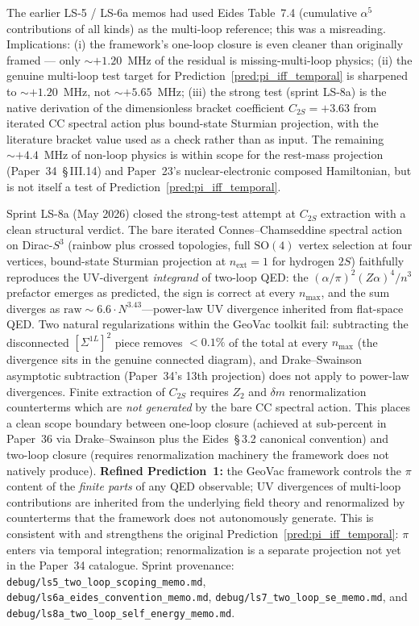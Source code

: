 \documentclass[11pt]{article}
\begin{document}
\begin{enumerate}
The earlier LS-5 / LS-6a memos had used Eides Table~7.4 (cumulative
$\alpha^5$ contributions of all kinds) as the multi-loop reference;
this was a misreading.  Implications: (i) the framework's one-loop
closure is even cleaner than originally framed --- only
$\sim +1.20$~MHz of the residual is missing-multi-loop physics;
(ii) the genuine multi-loop test target for
Prediction~\ref{pred:pi_iff_temporal} is sharpened to
$\sim +1.20$~MHz, not $\sim +5.65$~MHz; (iii) the strong test
(sprint LS-8a) is the native derivation of the dimensionless bracket
coefficient $C_{2S} = +3.63$ from iterated CC spectral action plus
bound-state Sturmian projection, with the literature bracket value
used as a check rather than as input.  The remaining $\sim +4.4$~MHz
of non-loop physics is within scope for the rest-mass projection
(Paper~34~\S\,III.14) and Paper~23's nuclear-electronic composed
Hamiltonian, but is not itself a test of
Prediction~\ref{pred:pi_iff_temporal}.

Sprint LS-8a (May 2026) closed the strong-test attempt at $C_{2S}$
extraction with a clean structural verdict.  The bare iterated
Connes--Chamseddine spectral action on Dirac-$S^3$ (rainbow plus
crossed topologies, full $\mathrm{SO}(4)$ vertex selection at four
vertices, bound-state Sturmian projection at $n_\text{ext} = 1$ for
hydrogen $2S$) faithfully reproduces the UV-divergent
\emph{integrand} of two-loop QED: the $(\alpha/\pi)^2 (Z\alpha)^4 /
n^3$ prefactor emerges as predicted, the sign is correct at every
$n_\text{max}$, and the sum diverges as
$\text{raw} \sim 6.6 \cdot N^{3.43}$---power-law UV divergence
inherited from flat-space QED.  Two natural regularizations
within the GeoVac toolkit fail: subtracting the disconnected
$[\Sigma^{1L}]^2$ piece removes ${<}0.1\%$ of the total at every
$n_\text{max}$ (the divergence sits in the genuine connected
diagram), and Drake--Swainson asymptotic subtraction
(Paper~34's 13th projection) does not apply to power-law
divergences.  Finite extraction of $C_{2S}$ requires $Z_2$ and
$\delta m$ renormalization counterterms which are
\emph{not generated} by the bare CC spectral action.  This places
a clean scope boundary between one-loop closure (achieved at
sub-percent in Paper~36 via Drake--Swainson plus the Eides~\S\,3.2
canonical convention) and two-loop closure (requires renormalization
machinery the framework does not natively produce).
\textbf{Refined Prediction~1:} the GeoVac framework controls the
$\pi$ content of the \emph{finite parts} of any QED observable; UV
divergences of multi-loop contributions are inherited from the
underlying field theory and renormalized by counterterms that the
framework does not autonomously generate.  This is consistent with
and strengthens the original Prediction~\ref{pred:pi_iff_temporal}:
$\pi$ enters via temporal integration; renormalization is a separate
projection not yet in the Paper~34 catalogue.  Sprint provenance:
\texttt{debug/ls5\_two\_loop\_scoping\_memo.md},
\texttt{debug/ls6a\_eides\_convention\_memo.md},
\texttt{debug/ls7\_two\_loop\_se\_memo.md}, and
\texttt{debug/ls8a\_two\_loop\_self\_energy\_memo.md}.


\end{enumerate}
\end{document}
